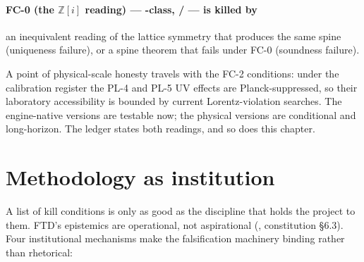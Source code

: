 \paragraph{FC-0 (the $\mathbb{Z}[i]$ reading) --- -class,
/ --- is killed by} an inequivalent reading of the
lattice symmetry that produces the same spine (uniqueness failure), or a spine
theorem that fails under FC-0 (soundness failure).

\noindent
A point of physical-scale honesty travels with the FC-2 conditions: under the
calibration register the PL-4 and PL-5 UV effects are Planck-suppressed, so their
laboratory accessibility is bounded by current Lorentz-violation searches. The
engine-native versions are testable now; the physical versions are conditional and
long-horizon. The ledger states both readings, and so does this chapter.

\section{Methodology as institution}\label{sec:methodology}

A list of kill conditions is only as good as the discipline that holds the
project to them. FTD's epistemics are operational, not aspirational
(, constitution \S6.3). Four institutional mechanisms make the
falsification machinery binding rather than rhetorical:

